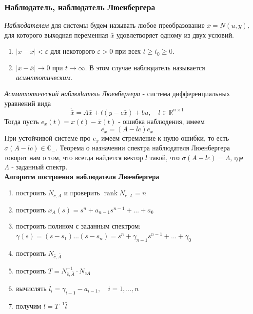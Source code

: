 \documentclass[A4]{article}
\begin{document}
\subsubsection{Наблюдатель, наблюдатель Люенбергера}
\emph{Наблюдателем} для системы будем называть любое преобразование $\bar{x}=N(u,y)$, для которого выходная переменная $\bar{x}$ удовлетворяет одному из двух условий.
\begin{enumerate}
	\item $|x-\bar{x}|<\varepsilon$ для некоторого $\varepsilon>0$ при всех $t\ge t_0\ge 0$.
	\item $|x-\bar{x}|\rightarrow 0$ при $t\rightarrow\infty$. В этом случае наблюдатель называется \emph{асимптотическим}.
\end{enumerate}
\emph{Асимптотический наблюдатель Люенбергера} - система дифференциальных уравнений вида
\begin{equation*}
\dot{\bar{x}}=A\bar{x}+l(y-c\bar{x})+bu,\quad l\in\mathbb{R}^{n\times 1}
\end{equation*}
Тогда пусть $e_x(t)=x(t)-\bar{x}(t)$ - ошибка наблюдения, имеем
\begin{equation*}
\dot{e_x}=(A-lc)e_x
\end{equation*}
При устойчивой системе про $e_x$ имеем стремление к нулю ошибки, то есть $\sigma(A-lc)\in\mathbb{C}_{-}$. Теорема о назначении спектра наблюдателя Люенбергера говорит нам о том, что всегда найдется вектор $l$ такой, что $\sigma(A-lc)=\Lambda$, где $\Lambda$ - заданный спектр.\\
\textbf{Алгоритм построения наблюдателя Люенбергера}
\begin{enumerate}
	\item построить $N_{c,A}$ и проверить $\operatorname{rank}N_{c,A}=n$
	\item построить $x_{A}(s)=s^n+a_{n-1}s^{n-1}+\ldots+a_0$
	\item построить полином с заданным спектром: $\gamma(s)=(s-s_1)\ldots(s-s_n)=s^n+\gamma_{n-1}s^{n-1}+\ldots+\gamma_0$
	\item построить $N_{\bar{c},\bar{A}}$
	\item построить $T=N_{\bar{c},\bar{A}}^{-1}\cdot N_{cA}$
	\item вычислять $\bar{l}_i=\gamma_{i-1}-a_{i-1},\quad i=1,\ldots,n$
	\item получим $l=T^{-1}\bar{l}$ 
\end{enumerate}
\end{document}
